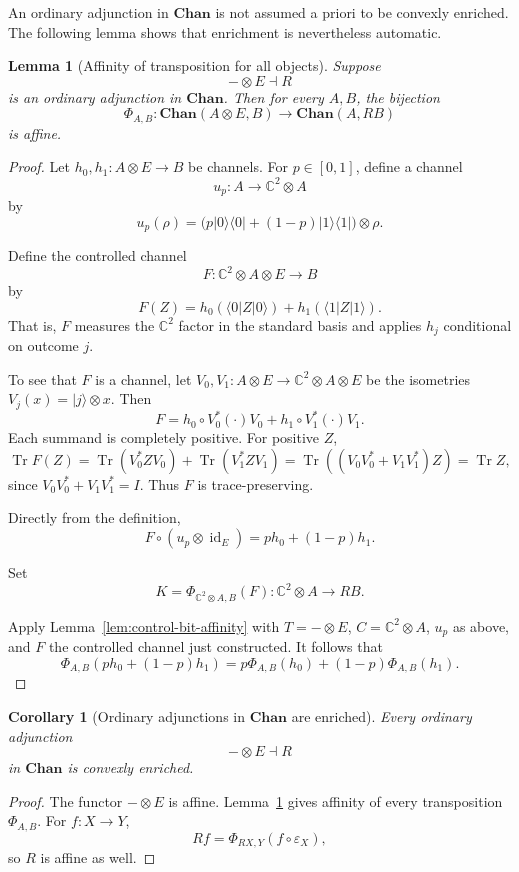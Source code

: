 \documentclass[11pt]{article}
\newtheorem{corollary}[theorem]{Corollary}
\newtheorem{lemma}[theorem]{Lemma}
\DeclareMathOperator{\Tr}{Tr}
\DeclareMathOperator{\id}{id}
\begin{document}
An ordinary adjunction in $\mathbf{Chan}$ is not assumed a priori to be
convexly enriched. The following lemma shows that enrichment is nevertheless
automatic.

\begin{lemma}[Affinity of transposition for all objects]
\label{lem:chan-affinity}
Suppose
\[
-\otimes E\dashv R
\]
is an ordinary adjunction in $\mathbf{Chan}$. Then for every $A,B$, the
bijection
\[
\Phi_{A,B}:
\mathbf{Chan}(A\otimes E,B)
\longrightarrow
\mathbf{Chan}(A,RB)
\]
is affine.
\end{lemma}

\begin{proof}
Let $h_0,h_1:A\otimes E\to B$ be channels. For $p\in[0,1]$, define a
channel
\[
u_p:A\longrightarrow\mathbb C^2\otimes A
\]
by
\[
u_p(\rho)=
\bigl(p|0\rangle\langle0|+(1-p)|1\rangle\langle1|\bigr)\otimes\rho.
\]

Define the controlled channel
\[
F:\mathbb C^2\otimes A\otimes E\longrightarrow B
\]
by
\[
F(Z)=h_0(\langle0|Z|0\rangle)+h_1(\langle1|Z|1\rangle).
\]
That is, $F$ measures the $\mathbb C^2$ factor in the standard basis and
applies $h_j$ conditional on outcome $j$.

To see that $F$ is a channel, let
$V_0,V_1:A\otimes E\to\mathbb C^2\otimes A\otimes E$ be the isometries
$V_j(x)=|j\rangle\otimes x$. Then
\[
F=h_0\circ V_0^*(\cdot)V_0+h_1\circ V_1^*(\cdot)V_1.
\]
Each summand is completely positive. For positive $Z$,
\[
\Tr F(Z)
=
\Tr(V_0^*ZV_0)+\Tr(V_1^*ZV_1)
=
\Tr((V_0V_0^*+V_1V_1^*)Z)
=
\Tr Z,
\]
since $V_0V_0^*+V_1V_1^*=I$. Thus $F$ is trace-preserving.

Directly from the definition,
\[
F\circ(u_p\otimes\id_E)=ph_0+(1-p)h_1.
\]

Set
\[
K=\Phi_{\mathbb C^2\otimes A,B}(F):
\mathbb C^2\otimes A\longrightarrow RB.
\]

Apply Lemma~\ref{lem:control-bit-affinity} with $T=-\otimes E$,
$C=\mathbb C^2\otimes A$, $u_p$ as above, and $F$ the controlled channel
just constructed. It follows that
\[
\Phi_{A,B}(ph_0+(1-p)h_1)
=
p\Phi_{A,B}(h_0)+(1-p)\Phi_{A,B}(h_1).
\]
\end{proof}

\begin{corollary}[Ordinary adjunctions in $\mathbf{Chan}$ are enriched]
\label{cor:chan-enriched}
Every ordinary adjunction
\[
-\otimes E\dashv R
\]
in $\mathbf{Chan}$ is convexly enriched.
\end{corollary}

\begin{proof}
The functor $-\otimes E$ is affine. Lemma~\ref{lem:chan-affinity} gives
affinity of every transposition $\Phi_{A,B}$. For $f:X\to Y$,
\[
Rf=\Phi_{RX,Y}(f\circ\varepsilon_X),
\]
so $R$ is affine as well.
\end{proof}
\end{document}
